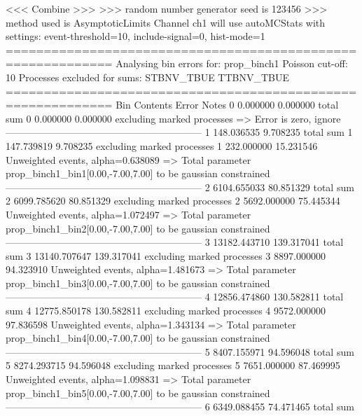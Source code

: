  <<< Combine >>> 
>>> random number generator seed is 123456
>>> method used is AsymptoticLimits
Channel ch1 will use autoMCStats with settings: event-threshold=10, include-signal=0, hist-mode=1
============================================================
Analysing bin errors for: prop_binch1
Poisson cut-off: 10
Processes excluded for sums: STBNV_TBUE TTBNV_TBUE
============================================================
Bin        Contents        Error           Notes                         
0          0.000000        0.000000        total sum                     
0          0.000000        0.000000        excluding marked processes    
  => Error is zero, ignore      
------------------------------------------------------------
1          148.036535      9.708235        total sum                     
1          147.739819      9.708235        excluding marked processes    
1          232.000000      15.231546       Unweighted events, alpha=0.638089
  => Total parameter prop_binch1_bin1[0.00,-7.00,7.00] to be gaussian constrained
------------------------------------------------------------
2          6104.655033     80.851329       total sum                     
2          6099.785620     80.851329       excluding marked processes    
2          5692.000000     75.445344       Unweighted events, alpha=1.072497
  => Total parameter prop_binch1_bin2[0.00,-7.00,7.00] to be gaussian constrained
------------------------------------------------------------
3          13182.443710    139.317041      total sum                     
3          13140.707647    139.317041      excluding marked processes    
3          8897.000000     94.323910       Unweighted events, alpha=1.481673
  => Total parameter prop_binch1_bin3[0.00,-7.00,7.00] to be gaussian constrained
------------------------------------------------------------
4          12856.474860    130.582811      total sum                     
4          12775.850178    130.582811      excluding marked processes    
4          9572.000000     97.836598       Unweighted events, alpha=1.343134
  => Total parameter prop_binch1_bin4[0.00,-7.00,7.00] to be gaussian constrained
------------------------------------------------------------
5          8407.155971     94.596048       total sum                     
5          8274.293715     94.596048       excluding marked processes    
5          7651.000000     87.469995       Unweighted events, alpha=1.098831
  => Total parameter prop_binch1_bin5[0.00,-7.00,7.00] to be gaussian constrained
------------------------------------------------------------
6          6349.088455     74.471465       total sum                     
